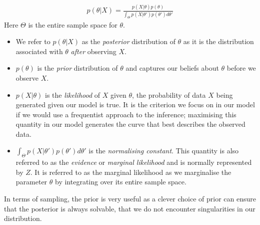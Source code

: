\documentclass[12pt]{article} %
\begin{document}
	\begin{align} \label{Bayes_theorem}
	p(\theta | X) = \frac{p(X | \theta) p(\theta)}{\int_\Theta p(X | \theta ') p(\theta ') d \theta '}
	\end{align}
	Here $\Theta$ is the entire sample space for $\theta$. 
	\begin{itemize}
		\item We refer to $p(\theta | X)$ as the \emph{posterior} distribution of $\theta$ as it is the distribution associated with $\theta$ \emph{after} observing $X$.
		\item $p(\theta)$ is the \emph{prior} distribution of $\theta$ and captures our beliefs about $\theta$ before we observe $X$.
		\item $p(X | \theta)$ is the \emph{likelihood} of $X$ given $\theta$, the probability of data $X$ being generated given our model is true. It is the criterion we focus on in our model if we would use a frequentist approach to the inference; maximising this quantity in our model generates the curve that best describes the observed data. 
		\item $\int_\Theta p(X | \theta ') p(\theta ') d \theta '$ is the \emph{normalising constant}. This quantity is also referred to as the \emph{evidence} \cite{mackay_information_2003} or \emph{marginal likelihood} and is normally represented by $Z$. It is referred to as the marginal likelihood as we marginalise the parameter $\theta$ by integrating over its entire sample space.
	\end{itemize}
	
	In terms of sampling, the prior is very useful as a clever choice of prior can ensure that the posterior is always solvable, that we do not encounter singularities in our distribution.
	
\end{document}
